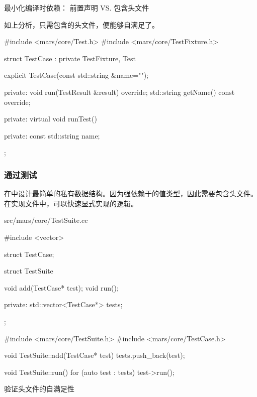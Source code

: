 \begin{content}
\begin{episode}{最小化编译时依赖： 前置声明 VS. 包含头文件}
\begin{content}
如上分析，只需包含的头文件，便能够自满足了。

\begin{c++}[title={\ttfamily{验证头文件的自满足性: include/mars/core/TestCase.h}}]
#include <mars/core/Test.h>
#include <mars/core/TestFixture.h>

struct TestCase : private TestFixture, Test {
  explicit TestCase(const std::string &name="");
    
private:
  void run(TestResult &result) override;
  std::string getName() const override;

private:
  virtual void runTest() {}
    
private:
  const std::string name;
};
\end{c++}

\end{content}
\end{episode}

\subsubsection{通过测试}

在中设计最简单的私有数据结构。因为强依赖于的值类型，因此需要包含头文件。在实现文件中，可以快速显式实现的逻辑。

\begin{diff}{src/mars/core/TestSuite.cc}
 \begin{minicpp}
#include <vector>

struct TestCase;

struct TestSuite {
  void add(TestCase* test);
  void run();

private:
  std::vector<TestCase*> tests;
};
 \end{minicpp}
\tcblower
 \begin{minicpp}
#include <mars/core/TestSuite.h>
#include <mars/core/TestCase.h>

void TestSuite::add(TestCase* test) {
  tests.push_back(test);
}

void TestSuite::run() {
  for (auto test : tests) {
    test->run();
  }
}
 \end{minicpp}
\end{diff}

\begin{episode}{验证头文件的自满足性}
\begin{content}


\end{content}
\end{episode}
\end{content}
